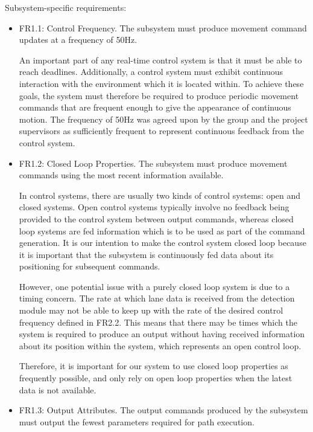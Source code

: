 \documentclass[titlepage, draft]{article}
\begin{document}
{\begin{itemize}
\end{itemize}
Subsystem-specific requirements:
\begin{itemize}

	\item FR1.1: Control Frequency.
	      The subsystem must produce movement command updates at a frequency of 50Hz.

	      An important part of any real-time control system is that it must be able to reach deadlines. Additionally, a control system must exhibit continuous interaction with the environment which it is located within. To achieve these goals, the system must therefore be required to produce periodic movement commands that are frequent enough to give the appearance of continuous motion. The frequency of 50Hz was agreed upon by the group and the project supervisors as sufficiently frequent to represent continuous feedback from the control system.

	\item FR1.2: Closed Loop Properties.
	      The subsystem must produce movement commands using the most recent information available.

	      In control systems, there are usually two kinds of control systems: open and closed systems. Open control systems typically involve no feedback being provided to the control system between output commands, whereas closed loop systems are fed information which is to be used as part of the command generation. It is our intention to make the control system closed loop because it is important that the subsystem is continuously fed data about its positioning for subsequent commands.

	      However, one potential issue with a purely closed loop system is due to a timing concern. The rate at which lane data is received from the detection module may not be able to keep up with the rate of the desired control frequency defined in FR2.2. This means that there may be times which the system is required to produce an output without having received information about its position within the system, which represents an open control loop.

	      Therefore, it is important for our system to use closed loop properties as frequently possible, and only rely on open loop properties when the latest data is not available.

	\item FR1.3: Output Attributes. The output commands produced by the subsystem must output the fewest parameters required for path execution.


\end{itemize}}
\end{document}
